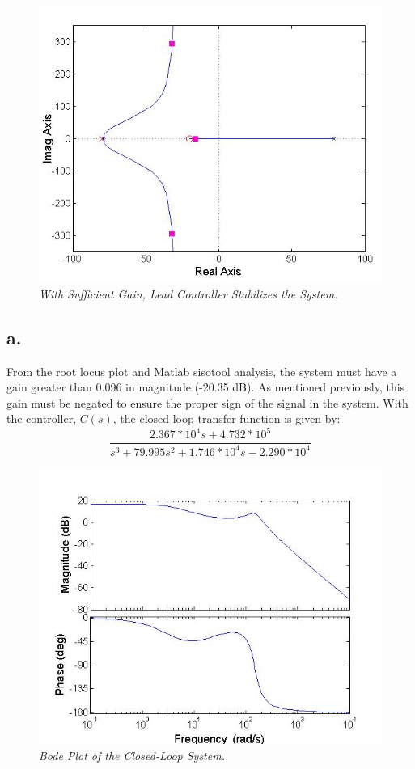 \documentclass{article}
\theoremstyle{plain}
\theoremstyle{definition}
\theoremstyle{remark}
\begin{document}
\begin{figure}[h!]
\begin{center}
\includegraphics[width = 12cm]{FigureB.jpg}
\caption{\emph{With Sufficient Gain, Lead Controller Stabilizes the System.}}
\label{Q2}
\end{center}
\end{figure}

\subsection*{a.}
From the root locus plot and Matlab sisotool analysis, the system must have a gain greater than 0.096 in magnitude (-20.35 dB). As mentioned previously, this gain must be negated to ensure the proper sign of the signal in the system. With the controller, $C(s)$, the closed-loop transfer function is given by:
$$\frac{2.367*10^4 s+ 4.732*10^5}{s^3+ 79.995 s^2+1.746*10^4 s - 2.290*10^4}$$

\begin{figure}[htb]
\begin{center}
\includegraphics[width = 12cm]{ClosedLoopBode2.jpg}
\caption{\emph{Bode Plot of the Closed-Loop System.}}
\label{Q2_a}
\end{center}
\end{figure}
\end{document}
